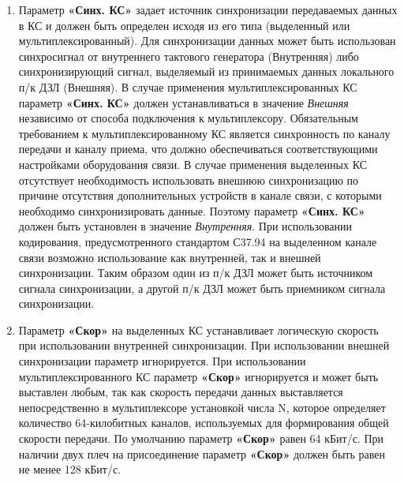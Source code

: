 \begin{enumerate}[label=\arabic{section}.\arabic{subsection}.\arabic{enumi}, labelsep=4pt, leftmargin=0pt, itemindent=57pt, itemsep=0pt, parsep=5pt]
\begin{enumerate}[label=\arabic{section}.\arabic{subsection}.\arabic{enumi}.\arabic*, labelsep=4pt, leftmargin=0em, itemindent=65pt, parsep=0pt]

\item
Параметр \textbf{«Синх. КС»} задает источник синхронизации передаваемых данных в КС и должен быть определен исходя из его типа (выделенный или мультиплексированный).
Для синхронизации данных может быть использован синхросигнал от внутреннего тактового генератора (Внутренняя) либо синхронизирующий сигнал, выделяемый из принимаемых данных локального п/к ДЗЛ (Внешняя).
В случае применения мультиплексированных КС параметр \textbf{«Синх. КС»} должен устанавливаться в значение \textit{Внешняя} независимо от способа подключения к мультиплексору.
Обязательным требованием к мультиплексированному КС является синхронность по каналу передачи и каналу приема, что должно обеспечиваться соответствующими настройками оборудования связи.
В случае применения выделенных КС отсутствует необходимость использовать внешнюю синхронизацию по причине отсутствия дополнительных устройств в канале связи, с которыми необходимо синхронизировать данные.
Поэтому параметр \textbf{«Синх. КС»} должен быть установлен в значение \textit{Внутренняя}.
При использовании кодирования, предусмотренного стандартом С37.94 на выделенном канале связи возможно использование как внутренней, так и внешней синхронизации.
Таким образом один из п/к ДЗЛ может быть источником сигнала синхронизации, а другой п/к ДЗЛ может быть приемником сигнала синхронизации.

\item
Параметр \textbf{«Скор»} на выделенных КС устанавливает логическую скорость при использовании внутренней синхронизации.
При использовании внешней синхронизации параметр игнорируется.
При использовании мультиплексированного КС параметр \textbf{«Скор»} игнорируется и может быть выставлен любым, так как скорость передачи данных выставляется непосредственно в мультиплексоре установкой числа N, которое определяет количество 64-килобитных каналов, используемых для формирования общей скорости передачи.
По умолчанию параметр \textbf{«Скор»} равен 64 кБит/с. При наличии двух плеч на присоединение параметр \textbf{«Скор»} должен быть равен не менее 128 кБит/с.


\end{enumerate}
\end{enumerate}
